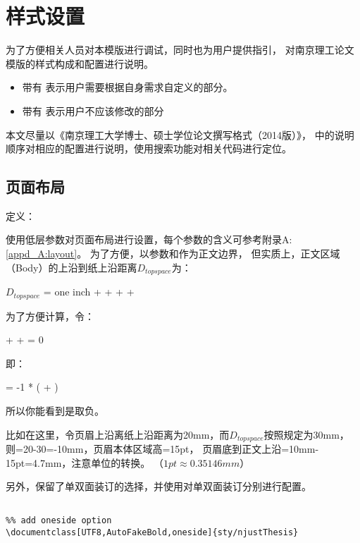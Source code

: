 \chapter{样式设置}
\label{chap:chap3}

为了方便相关人员对本模版进行调试，同时也为用户提供指引，
对南京理工论文模版的样式构成和配置进行说明。
\begin{itemize}
  \item 带有 \redstar 表示用户需要根据自身需求自定义的部分。
  \item 带有 \prohibit 表示用户不应该修改的部分
\end{itemize}


本文尽量以《南京理工大学博士、硕士学位论文撰写格式（2014版）》\cite{2014njust_thesis}，
中的说明顺序对相应的配置进行说明，使用搜索功能对相关代码进行定位。


\section{页面布局}

定义：

使用低层参数对页面布局进行设置，每个参数的含义可参考附录A:\ref{appd_A:layout}。
为了方便，以参数\ilcode{\hoffest}和\ilcode{\voffset}作为正文边界，
但实质上，正文区域（Body）的上沿到纸上沿距离$D_{topspace}$为：

$D_{topspace}$ = one inch + \ilcode{\voffest} + \ilcode{\topmargin} + 
\ilcode{\headheight} + \ilcode{\headsep}

为了方便计算，令：

\ilcode{\topmargin} + \ilcode{\headheight} + \ilcode{\headsep} = 0

即：

\ilcode{\topmargin} = -1 * (\ilcode{\headheight} + \ilcode{\headsep})

所以你能看到\ilcode{\topmargin}是取负。

比如在这里，令页眉上沿离纸上沿距离为20mm，而$D_{topspace}$按照规定为30mm，
则\ilcode{\topmargin}=20-30=-10mm，页眉本体区域高\ilcode{\headheight}=15pt，
页眉底到正文上沿\ilcode{\headsep}=10mm-15pt=4.7mm，注意单位的转换。
（$1pt\approx 0.35146mm$）

另外，保留了单双面装订的选择，并使用对单双面装订分别进行配置。

\begin{lstlisting}[style=mylatex]
%% myThesis.tex

%% add oneside option
\documentclass[UTF8,AutoFakeBold,oneside]{sty/njustThesis}
\end{lstlisting}

